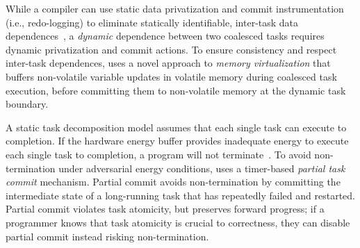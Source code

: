 

While a compiler can use static data privatization and commit instrumentation
(i.e., redo-logging) to eliminate statically identifiable, inter-task data
dependences~\citep{alpaca}, a \emph{dynamic} dependence between two coalesced
tasks requires dynamic privatization and commit actions. 
%
To ensure consistency and respect inter-task dependences, \sys uses a novel
approach to \emph{memory virtualization} that buffers non-volatile variable
updates in volatile memory during coalesced task execution, before committing
them to non-volatile memory at the dynamic task boundary.
%

A static task decomposition model assumes that each
single task can execute to completion.  If the hardware energy buffer provides
inadequate energy to execute each single task to completion, a program will not
terminate~\cite{cleancut}. To avoid non-termination under adversarial 
energy conditions, \sys uses a timer-based {\em partial task commit} mechanism.
Partial commit avoids non-termination by committing the intermediate state of a long-running
task that has repeatedly failed and restarted.  Partial commit violates
task atomicity, but preserves forward progress; if a programmer knows that
task atomicity is crucial to correctness, they can disable partial commit
instead risking non-termination.


